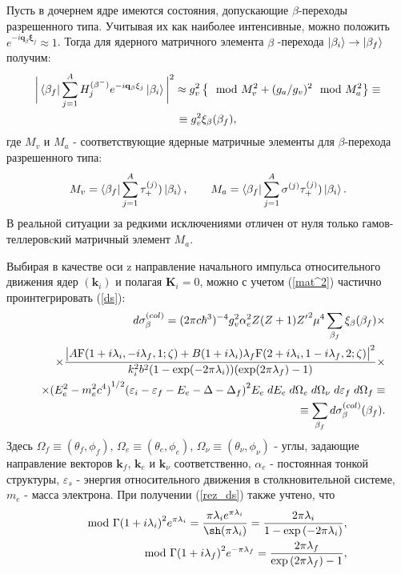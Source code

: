 \documentclass[%
master,    %
natbib,      %
subf,        %
href,        %
colorlinks,  %
]{disser}
\let\vec=\mathbf
\begin{document}
Пусть в дочернем ядре имеются состояния,
допускающие $\beta$-переходы разрешенного типа. Учитывая их как
наиболее интенсивные, можно положить $e^{-i\vec q_\beta\vec\xi_{j}}{\approx}1$.
Тогда для ядерного матричного элемента  $\beta$ -перехода
$\ket{\beta_i}\to\ket{\beta_f}$ получим:
\begin{multline}\label{mat_nuc}
\bigg|\bra{\beta_f }  \sum_{j=1}^A H^{(\beta^-)}_{j}
e^{-i\vec q_\beta\vec\xi_{j}}\ket{ \beta_i}\bigg|^2\approx
g^2_v\left\{\mod{M_v}^2+(g_a/g_v)^2\mod{M_a}^2\right\}\equiv\\
\equiv
g^2_v \xi_\beta(\beta_f),
\end{multline}
где  $M_v$ и $M_a$ - соответствующие ядерные матричные элементы
для $\beta$-перехода разрешенного типа:
\begin{eqnarray}
M_v=\bra{\beta_f } \sum_{j=1}^A \tau_+^{(j)}) \ket{ \beta_i},\qquad
M_a=\bra{\beta_f } \sum_{j=1}^A \vec\sigma^{(j)}\tau_+^{(j)}) \ket{ \beta_i}.\nonumber
\end{eqnarray}
В реальной ситуации за редкими исключениями отличен от нуля только
гамов-теллеров\-cкий матричный элемент $M_a$.

Выбирая в качестве оси z направление начального импульса относительного движения
ядер $(\vec k_i )$ и полагая $\vec K_i =0 $,  можно  с учетом (\ref{mat^2})
частично  проинтегрировать (\ref{ds}):
\begin{eqnarray}\label{rez_ds}
&&d\sigma^{(col)}_\beta=
(2 \pi c \hbar^3)^{-4}
g_v^2 \alpha_e^2 Z (Z+1) {Z'}^2 \mu^4
\sum_{\beta_f}\xi_\beta(\beta_f)\times\nonumber\\
&&\times {{\big| A {\rm F} (1+i \lambda_i,-i \lambda_f,1;\zeta) + B (1+i \lambda_i)\lambda_f
		{\rm F} (2+i \lambda_i,1-i \lambda_f,2;\zeta)\big|^2}\over{ k_i^2 b^2
		(1-\exp(-2\pi\lambda_i))(\exp(2\pi\lambda_f)-1)}}\times\nonumber\\
&&\times {(E_e^2 - m_e^2 c^4)}^{1/2}{(\varepsilon_i - \varepsilon_f - E_e - \Delta
	- \Delta_f)}^2  E_e \;dE_e \; d\Omega_e \; d\Omega_{\nu}\;d\varepsilon_f \; d\Omega_f \equiv\nonumber\\
&&\equiv \sum_{\beta_f} d\sigma^{(col)}_\beta (\beta_f).
\end{eqnarray}
Здесь $\Omega_f\equiv (\theta_f,\phi_f)$, $\Omega_e\equiv (\theta_e,\phi_e)$,
$\Omega_\nu\equiv (\theta_\nu,\phi_\nu)$ - углы, задающие направление
векторов ${\vec k}_f$, ${\vec k}_e$ и ${\vec k}_\nu$ соответственно,
$\alpha_e$ - постоянная тонкой
структуры, $\varepsilon_s$ - энергия относительного движения в столкновительной
системе, $m_e$ - масса электрона. При получении (\ref{rez_ds}) также учтено, что
\begin{eqnarray}
&&\mod{\Gamma{(1+i\lambda_i)}}^2 e^{\pi\lambda_i} = {{\pi\lambda_i e^{\pi\lambda_i}}
	\over{\sh (\pi\lambda_i)}} = {{2 \pi\lambda_i}\over{1- \exp{(-2\pi\lambda_i)}}},\nonumber\\
&&\mod{\Gamma{(1+i\lambda_f)}}^2 e^{- \pi\lambda_f} = {{2 \pi\lambda_f}\over{\exp{(2 \pi\lambda_f)-1}}},
\end{eqnarray}
\end{document}
